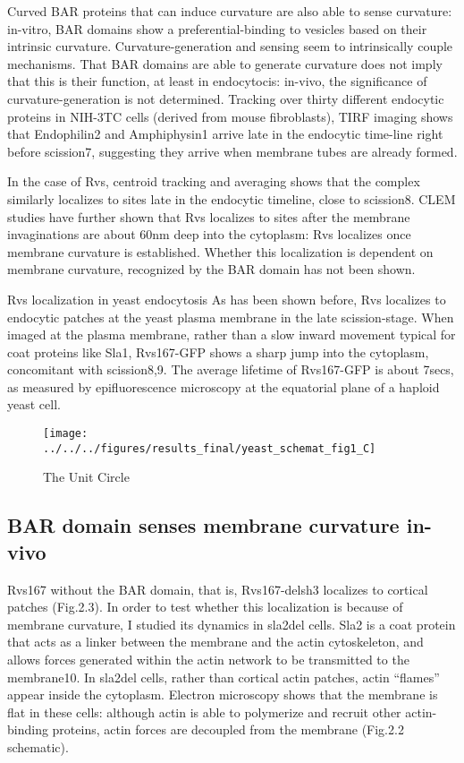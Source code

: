 \vspace{5mm}
Curved BAR proteins that can induce curvature are also able to sense curvature: in-vitro, BAR domains show a preferential-binding to vesicles based on their intrinsic curvature. Curvature-generation and sensing seem to intrinsically couple mechanisms. That BAR domains are able to generate curvature does not imply that this is their function, at least in endocytocis: in-vivo, the significance of curvature-generation is not determined. Tracking over thirty different endocytic proteins in NIH-3TC cells (derived from mouse fibroblasts), TIRF imaging shows that Endophilin2 and Amphiphysin1 arrive late in the endocytic time-line right before scission7, suggesting they arrive when membrane tubes are already formed. 

\vspace{5mm}
In the case of Rvs, centroid tracking and averaging shows that the complex similarly localizes to sites late in the endocytic timeline, close to scission8. CLEM studies have further shown that Rvs localizes to sites after the membrane invaginations are about 60nm deep into the cytoplasm: Rvs localizes once membrane curvature is established. Whether this localization is dependent on membrane curvature, recognized by the BAR domain has not been shown. 

\vspace{5mm}
Rvs localization in yeast endocytosis
As has been shown before, Rvs localizes to endocytic patches at the yeast plasma membrane in the late scission-stage. When imaged at the plasma membrane, rather than a slow inward movement typical for coat proteins like Sla1, Rvs167-GFP shows a sharp jump into the cytoplasm, concomitant with scission8,9. The average lifetime of Rvs167-GFP is about 7secs, as measured by epifluorescence microscopy at the equatorial plane of a haploid yeast cell. 

\begin{figure}
\centering
\texttt{[image: ../../../figures/results\_final/yeast\_schemat\_fig1\_C]}
\caption{The Unit Circle \label{fig1}}
\end{figure}

	\subsection{BAR domain senses membrane curvature in-vivo}
	Rvs167 without the BAR domain, that is, Rvs167-delsh3 localizes to cortical patches (Fig.2.3). In order to test whether this localization is because of membrane curvature, I studied its dynamics in sla2del cells. Sla2 is a coat protein that acts as a linker between the membrane and the actin cytoskeleton, and allows forces generated within the actin network to be transmitted to the membrane10. In sla2del cells, rather than cortical actin patches, actin “flames” appear inside the cytoplasm. Electron microscopy shows that the membrane is flat in these cells: although actin is able to polymerize and recruit other actin-binding proteins, actin forces are decoupled from the membrane (Fig.2.2 schematic). 
	
